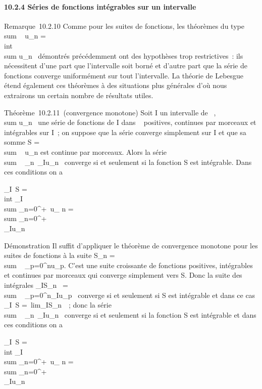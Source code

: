 \documentclass[]{article}
\begin{document}
\paragraph{10.2.4 Séries de fonctions intégrables sur un intervalle}

Remarque~10.2.10 Comme pour les suites de fonctions, les théorèmes du
type \\sum ~
\int  u\_n =\\int ~
\\sum  u\_n~
démontrés précédemment ont des hypothèses trop restrictives~: ils
nécessitent d'une part que l'intervalle soit borné et d'autre part que
la série de fonctions converge uniformément sur tout l'intervalle. La
théorie de Lebesgue étend également ces théorèmes à des situations plus
générales d'où nous extrairons un certain nombre de résultats utiles.

Théorème~10.2.11~(convergence monotone) Soit I un intervalle de ~,
\\sum  u\_n~ une
série de fonctions de I dans ~ positives, continues par morceaux et
intégrables sur I~; on suppose que la série converge simplement sur I et
que sa somme S = \\sum ~
u\_n est continue par morceaux. Alors la série
\\sum ~
\_n\in{}~\int  \_Iu\_n~ converge
si et seulement si la fonction S est intégrable. Dans ces conditions on
a

\int  \_I~S =\\int
 \_I \\sum
\_n=0^+\infty~u\_ n = \\sum
\_n=0^+\infty~\\\int
  \_Iu\_n

Démonstration Il suffit d'appliquer le théorème de convergence monotone
pour les suites de fonctions à la suite S\_n
= \\sum ~
\_p=0^nu\_p. C'est une suite croissante de
fonctions positives, intégrables et continues par morceaux qui converge
simplement vers S. Donc la suite des intégrales
\int  \_IS\_n~
= \\sum ~
\_p=0^n\int  \_Iu\_p~
converge si et seulement si S est intégrable et dans ce cas
\int  \_I~S =\
lim\int  \_IS\_n~~; donc la
série \\sum ~
\_n\in{}~\int  \_Iu\_n~ converge
si et seulement si la fonction S est intégrable et dans ces conditions
on a

\int  \_I~S =\\int
 \_I \\sum
\_n=0^+\infty~u\_ n = \\sum
\_n=0^+\infty~\\\int
  \_Iu\_n
\end{document}

